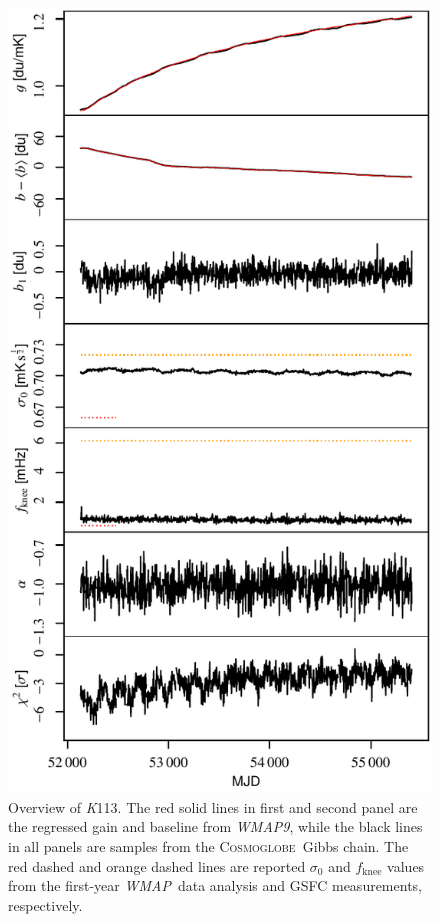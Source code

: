 \documentclass[twocolumn]{../../common/aa}
\def\WMAP{\emph{WMAP}}
\def\WMAPnine{\emph{WMAP9}}
\newcommand{\cosmoglobe}{\textsc{Cosmoglobe}}
\newcommand{\K}[0]{\textit K}
\begin{document}
\begin{figure}[t]
	\centering
	\includegraphics[width=\linewidth]{figures/instpar_CG_K113_v1.pdf}
	\caption{Overview of \K113. The red solid lines in first and second panel  are the regressed gain and baseline from \WMAPnine, while the black lines in all panels are samples from the \cosmoglobe\ Gibbs chain. The red dashed and orange dashed lines are reported $\sigma_0$ and $f_\mathrm{knee}$ values from the first-year \WMAP\ data analysis and GSFC measurements, respectively.}
	\label{fig:inst_K113}
\end{figure}
\end{document}
